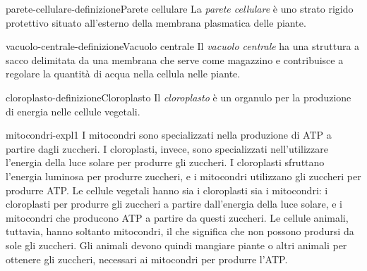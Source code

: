 \documentclass[preview]{standalone}
\begin{document}

\begin{snippetdefinition}{parete-cellulare-definizione}{Parete cellulare}
    La \textit{parete cellulare} è uno strato rigido protettivo situato all'esterno della membrana
    plasmatica delle piante.
\end{snippetdefinition}


\begin{snippetdefinition}{vacuolo-centrale-definizione}{Vacuolo centrale}
    Il \textit{vacuolo centrale} ha una struttura a sacco delimitata da una membrana che serve come
    magazzino e contribuisce a regolare la quantità di acqua nella cellula nelle piante.
\end{snippetdefinition}


\begin{snippetdefinition}{cloroplasto-definizione}{Cloroplasto}
    Il \textit{cloroplasto} è un organulo per la produzione di
    energia nelle cellule vegetali.
\end{snippetdefinition}

\begin{snippet}{mitocondri-expl1}
    I mitocondri sono specializzati nella
    produzione di ATP a partire dagli zuccheri. I cloroplasti, invece, sono specializzati
    nell'utilizzare l'energia della luce solare per produrre gli zuccheri.
    I cloroplasti sfruttano l'energia luminosa per produrre zuccheri, e i mitocondri
    utilizzano gli zuccheri per produrre ATP. Le cellule vegetali hanno sia i cloroplasti sia i
    mitocondri: i cloroplasti per produrre gli zuccheri a partire dall'energia della luce solare, e i
    mitocondri che producono ATP a partire da questi zuccheri. Le cellule animali, tuttavia,
    hanno soltanto mitocondri, il che significa che non possono prodursi da sole gli zuccheri. Gli
    animali devono quindi mangiare piante o altri animali per ottenere gli zuccheri, necessari ai
    mitocondri per produrre l'ATP.
\end{snippet}


\end{document}
